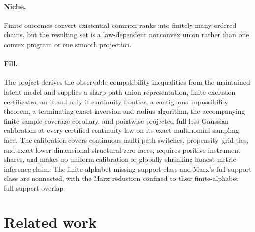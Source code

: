 \documentclass{article}
\begin{document}
\paragraph{Niche.} Finite outcomes convert existential common ranks into finitely many ordered chains, but the resulting set is a law-dependent nonconvex union rather than one convex program or one smooth projection.

\paragraph{Fill.} The project derives the observable compatibility inequalities from the maintained latent model and supplies a sharp path-union representation, finite exclusion certificates, an if-and-only-if continuity frontier, a contiguous impossibility theorem, a terminating exact inversion-and-radius algorithm, the accompanying finite-sample coverage corollary, and pointwise projected full-loss Gaussian calibration at every certified continuity law on its exact multinomial sampling face. The calibration covers continuous multi-path switches, propensity--grid ties, and exact lower-dimensional structural-zero faces, requires positive instrument shares, and makes no uniform calibration or globally shrinking honest metric-inference claim. The finite-alphabet missing-support class and Marx's full-support class are nonnested, with the Marx reduction confined to their finite-alphabet full-support overlap.

\section{Related work}
\end{document}
